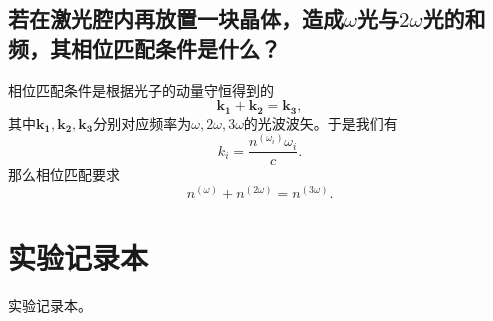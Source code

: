 \documentclass{mpltx}
\begin{document}
\subsection{若在激光腔内再放置一块晶体，造成$\omega$光与$2\omega$光的和频，其相位匹配条件是什么？}
相位匹配条件是根据光子的动量守恒得到的
\begin{equation}
  \bm{k_1}+\bm{k_2}=\bm{k_3},
\end{equation}
其中$\bm{k_1},\bm{k_2},\bm{k_3}$分别对应频率为$\omega,2\omega,3\omega$的光波波矢。于是我们有
\begin{equation}
  k_i=\frac{n^{(\omega_i)}\omega_i}{c}.
\end{equation}
那么相位匹配要求
\begin{equation}
  n^{(\omega)}+n^{(2\omega)}=n^{(3\omega)}.
\end{equation}
\section{实验记录本}
实验记录本。
\end{document}
